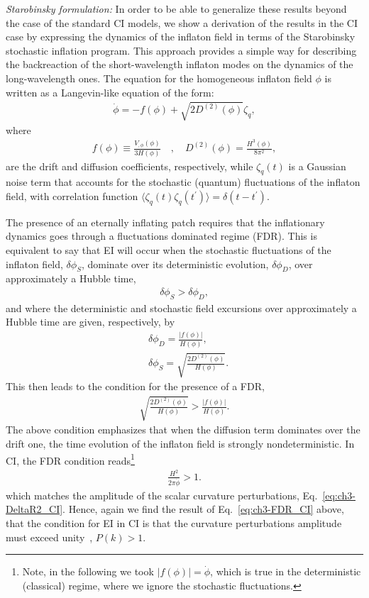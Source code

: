 {\it Starobinsky formulation:} In order to be able to generalize these results  beyond the case of the standard CI models,
we show a derivation of the results in the CI case
by expressing the dynamics of the inflaton field
in terms of the Starobinsky stochastic inflation
program.  This approach provides a simple way for
describing the backreaction of the  short-wavelength inflaton modes on
the dynamics of the long-wavelength ones. The equation for the
homogeneous inflaton field $\phi$ is written as a Langevin-like
equation of the form:
%
\begin{eqnarray}
  \dot{\phi}=-f(\phi)+\sqrt{2D^{(2)}(\phi)}\zeta_q,
  \label{eq:ch3-EOM_cold}
\end{eqnarray}
%
where
%
\begin{eqnarray}
    f(\phi)\equiv \frac{V_{,\phi}(\phi)}{3H(\phi)} \quad , \quad
    D^{(2)}(\phi)=\frac{H^3(\phi)}{8\pi^2},
\end{eqnarray}
%
are the drift and diffusion coefficients, respectively, while
$\zeta_q(t)$ is a Gaussian noise term that accounts for the stochastic
(quantum) fluctuations of the inflaton field, with correlation
function
$\langle\zeta_q(t)\zeta_q(t^\prime)\rangle=\delta(t-t^\prime)$.

The presence of an eternally inflating patch requires that the inflationary dynamics goes through a fluctuations dominated regime (FDR). This is equivalent to say that EI will occur when the stochastic fluctuations of the inflaton
field, $\delta\phi_S$, dominate over its deterministic evolution,
$\delta\phi_D$, over approximately a Hubble time,
%
\begin{eqnarray}
\delta\phi_S>\delta\phi_D,
\label{eq:ch3-FDR1}
\end{eqnarray}
%
and where the deterministic and stochastic field excursions over
approximately a Hubble time are given, respectively, by
%
\begin{align}    &\delta\phi_D=\frac{|f(\phi)|}{H(\phi)},
  \label{eq:ch3-deltaphiD_C}\\
  &\delta\phi_S=\sqrt{\frac{2D^{(2)}(\phi)}{H(\phi)}}.
  \label{eq:ch3-deltaphiS_C}
\end{align}
%
This then leads to the condition for the presence of a FDR,
%
\begin{eqnarray}
 \sqrt{\frac{2D^{(2)}(\phi)}{H(\phi)}}>
 \frac{|f(\phi)|}{H(\phi)}. \label{eq:ch3-FDR}
\end{eqnarray}
%
The above condition emphasizes that when the diffusion term dominates
over the drift one, the time evolution of the inflaton field is
strongly nondeterministic.  In CI, the FDR condition
reads\footnote{Note, in the following we took $|f(\phi)|=\dot{\phi}$,
which is true in the deterministic (classical) regime, where we ignore
the stochastic fluctuations.}
%
\begin{eqnarray}
\frac{H^2}{2\pi\dot{\phi}}>1.
\end{eqnarray}
%
which matches the amplitude of the scalar curvature perturbations, Eq.~\ref{eq:ch3-DeltaR2_CI}. Hence, again we find the result of Eq.~\ref{eq:ch3-FDR_CI} above, that the condition for EI in CI is that the curvature
perturbations amplitude must exceed
unity~\cite{Goncharov:1987ir,Guth:2007ng,Kinney:2014jya},
$P (k) > 1$.

